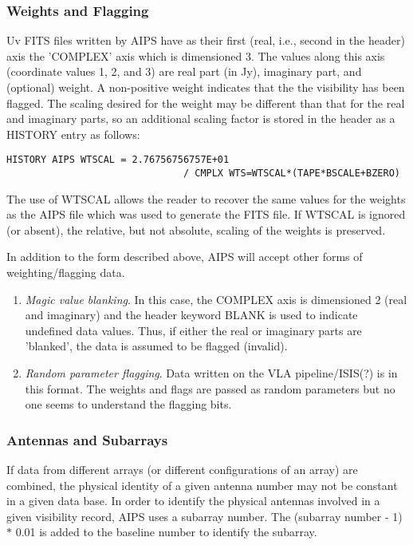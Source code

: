 \subsubsection{Weights and Flagging }
Uv FITS files written by AIPS have as their first (real, i.e., second
in the header) axis the 'COMPLEX' axis which is dimensioned 3.  The
values along this axis (coordinate values 1, 2, and 3) are real part
(in Jy), imaginary part, and (optional) weight.  A non-positive weight
indicates that the the visibility has been flagged.
The scaling desired for the weight may be different than that for the
real and imaginary parts, so an additional scaling factor is stored in
the header as a HISTORY entry as follows:

\begin{verbatim}
HISTORY AIPS WTSCAL = 2.76756756757E+01
                               / CMPLX WTS=WTSCAL*(TAPE*BSCALE+BZERO)

\end{verbatim}
The use of WTSCAL allows the reader to recover the same values for the
weights as the AIPS file which was used to generate the FITS file. If
WTSCAL is ignored (or absent), the relative, but not absolute, scaling
of the weights is preserved.

In addition to the form described above, AIPS will accept other forms
of weighting/flagging data.
\begin{enumerate} %
\item {\it Magic value blanking}.  In this case, the COMPLEX axis is
dimensioned 2 (real and imaginary) and the header keyword BLANK is
used to indicate undefined data values.  Thus, if either the real or
imaginary parts are 'blanked', the data is assumed to be flagged
(invalid).
\item {\it Random parameter flagging}.  Data written on the VLA
pipeline/ISIS(?)  is in this format.  The weights and flags are passed
as random parameters but no one seems to understand the flagging bits.


\end{enumerate} %
\subsubsection{Antennas and Subarrays }
If data from different arrays (or different configurations of an array) are
combined, the physical identity of a given antenna number may not be
constant in a given data base.  In order to identify the physical
antennas involved in a given visibility record, AIPS uses a subarray
number.  The (subarray number - 1) $\ast$ 0.01 is added to the
baseline number to identify the subarray.


